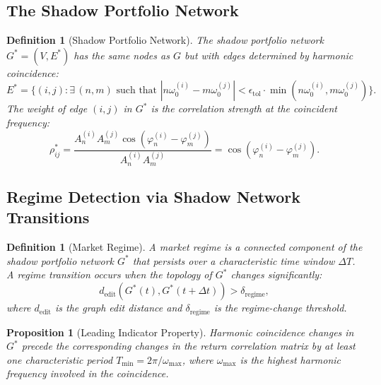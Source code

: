 \documentclass[twocolumn,10pt]{article}
\newtheorem{definition}[theorem]{Definition}
\newtheorem{proposition}[theorem]{Proposition}
\theoremstyle{remark}
\begin{document}
\subsection{The Shadow Portfolio Network}

\begin{definition}[Shadow Portfolio Network]
\label{def:shadow_portfolio}
The \emph{shadow portfolio network} $G^* = (V, E^*)$ has the same nodes as $G$ but with edges determined by harmonic coincidence:
\begin{equation}
    E^* = \{(i,j) : \exists \, (n,m) \text{ such that } |n\omega_0^{(i)} - m\omega_0^{(j)}| < \epsilon_{\text{tol}} \cdot \min(n\omega_0^{(i)}, m\omega_0^{(j)})\}.
    \label{eq:shadow_edges}
\end{equation}
The weight of edge $(i,j)$ in $G^*$ is the correlation strength at the coincident frequency:
\begin{equation}
    \rho_{ij}^* = \frac{A_n^{(i)} A_m^{(j)} \cos(\varphi_n^{(i)} - \varphi_m^{(j)})}{A_n^{(i)} A_m^{(j)}} = \cos(\varphi_n^{(i)} - \varphi_m^{(j)}).
    \label{eq:shadow_weight}
\end{equation}
\end{definition}

\subsection{Regime Detection via Shadow Network Transitions}

\begin{definition}[Market Regime]
\label{def:regime}
A \emph{market regime} is a connected component of the shadow portfolio network $G^*$ that persists over a characteristic time window $\Delta T$.  A \emph{regime transition} occurs when the topology of $G^*$ changes significantly:
\begin{equation}
    d_{\text{edit}}(G^*(t), G^*(t + \Delta t)) > \delta_{\text{regime}},
    \label{eq:regime_transition}
\end{equation}
where $d_{\text{edit}}$ is the graph edit distance and $\delta_{\text{regime}}$ is the regime-change threshold.
\end{definition}

\begin{proposition}[Leading Indicator Property]
\label{prop:leading}
Harmonic coincidence changes in $G^*$ precede the corresponding changes in the return correlation matrix by at least one characteristic period $T_{\min} = 2\pi / \omega_{\max}$, where $\omega_{\max}$ is the highest harmonic frequency involved in the coincidence.
\end{proposition}
\end{document}
